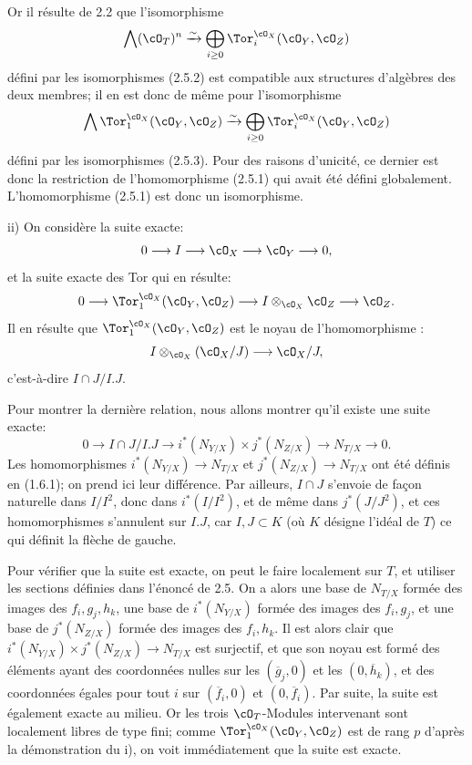 Or il
résulte de 2.2 que l'isomorphisme
\[
\bigwedge(\cO_T)^n\xrightarrow{\sim}
\bigoplus_{i\ge0}\Tor_i^{\cO_X}(\cO_Y,\cO_Z)
\]
défini par les isomorphismes (2.5.2) est compatible aux structures d'algèbres des deux membres; il en est donc de même pour l'isomorphisme
\[
\bigwedge\Tor_1^{\cO_X}(\cO_Y,\cO_Z)\xrightarrow{\sim}
\bigoplus_{i\ge0}\Tor_i^{\cO_X}(\cO_Y,\cO_Z)
\]
défini par les isomorphismes (2.5.3). Pour des raisons d'unicité, ce dernier est donc la restriction de l'homomorphisme (2.5.1) qui avait été défini globalement. L'homomorphisme (2.5.1) est donc un isomorphisme.

ii) On considère la suite exacte:
\[
0\longrightarrow I\longrightarrow \cO_X\longrightarrow \cO_Y\longrightarrow0,
\]
et la suite exacte des Tor qui en résulte:
\[
0\longrightarrow\Tor_1^{\cO_X}(\cO_Y,\cO_Z)
\longrightarrow I\otimes_{\cO_X}\cO_Z
\longrightarrow \cO_Z.
\]
Il en résulte que \(\Tor_1^{\cO_X}(\cO_Y,\cO_Z)\) est le noyau de l'homomorphisme :
\[
I\otimes_{\cO_X}(\cO_X/J)\longrightarrow \cO_X/J,
\]
c'est-à-dire \(I\cap J/I.J\).

Pour montrer la dernière relation, nous allons montrer qu'il existe une suite exacte:
\[
0\longrightarrow I\cap J/I.J
\longrightarrow i^*(N_{Y/X})\times j^*(N_{Z/X})
\longrightarrow N_{T/X}\longrightarrow0.
\]
Les homomorphismes \(i^*(N_{Y/X})\to N_{T/X}\) et \(j^*(N_{Z/X})\to N_{T/X}\) ont été définis en (1.6.1); on prend ici leur différence. Par ailleurs, \(I\cap J\) s'envoie de façon naturelle dans \(I/I^2\), donc dans \(i^*(I/I^2)\), et de même dans \(j^*(J/J^2)\), et ces homomorphismes s'annulent sur \(I.J\), car \(I,J\subset K\) (où \(K\) désigne l'idéal de \(T\)) ce qui définit la flèche de gauche.

Pour vérifier que la suite est exacte, on peut le faire localement sur \(T\), et utiliser les sections définies dans l'énoncé de 2.5. On a alors une base de \(N_{T/X}\) formée des images des \(f_i,g_j,h_k\), une base de \(i^*(N_{Y/X})\) formée des images des \(f_i,g_j\), et une base de \(j^*(N_{Z/X})\) formée des images des \(f_i,h_k\). Il est alors clair que \(i^*(N_{Y/X})\times j^*(N_{Z/X})\to N_{T/X}\) est surjectif, et que son noyau est formé des éléments ayant des coordonnées nulles sur les \((\overline g_j,0)\) et les \((0,\overline h_k)\), et des coordonnées égales pour tout \(i\) sur \((\overline f_i,0)\) et \((0,\overline f_i)\). Par suite, la suite est également exacte au milieu. Or les trois \(\cO_T\)-Modules intervenant sont localement libres de type fini; comme \(\Tor_1^{\cO_X}(\cO_Y,\cO_Z)\) est de rang \(p\) d'après la démonstration du i), on voit immédiatement que la suite est exacte.


